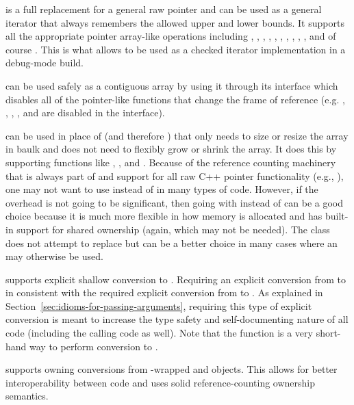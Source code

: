 \documentclass[pdf,ps2pdf,11pt]{SANDreport}
\begin{document}
{} is a full replacement for a general raw pointer and can be
used as a general iterator that always remembers the allowed upper and lower
bounds.  It supports all the appropriate pointer array-like operations
including {}, {}, {}, {},
{}, , {}, {}, {},
{}, and of course {}.  This is what allows
{} to be used as a checked iterator implementation in a
debug-mode build.

{} can be used safely as a contiguous array by using it through
its {} interface which disables all of the pointer-like functions
that change the frame of reference (e.g. {}, {}, ,
{}, and {} are disabled in the {} interface).

{} can be used in place of {} (and
therefore {}) that only needs to size or resize the array
in baulk and does not need to flexibly grow or shrink the array.  It
does this by supporting functions like {},
{}, and {}.  Because of the reference
counting machinery that is always part of {} and support
for all raw C++ pointer functionality (e.g., {}), one may
not want to use {} instead of {} in many
types of code.  However, if the overhead is not going to be
significant, then going with {} instead of {}
can be a good choice because it is much more flexible in how memory is
allocated and has built-in support for shared ownership (again, which
may not be needed).  The class {} does not attempt to
replace {} but can be a better choice in many cases where
an {} may otherwise be used.

{} supports explicit shallow conversion to
{}.  Requiring an explicit conversion from
{} to {} in consistent with the required
explicit conversion from {} to {}.  As explained in
Section~\ref{sec:idioms-for-passing-arguments}, requiring this type of
explicit conversion is meant to increase the type safety and
self-documenting nature of all code (including the calling code as
well).  Note that the {} function is a
very short-hand way to perform conversion to {}.

{} supports owning conversions from {}-wrapped
{} and {} objects.  This allows for better
interoperability between code and uses solid reference-counting
ownership semantics.
\end{document}
